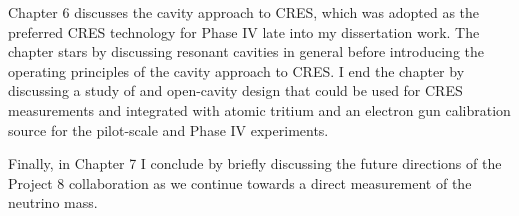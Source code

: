 Chapter 6 discusses the cavity approach to CRES, which was adopted as the preferred CRES technology for Phase IV late into my dissertation work. The chapter stars by discussing resonant cavities in general before introducing the operating principles of the cavity approach to CRES. I end the chapter by discussing a study of and open-cavity design that could be used for CRES measurements and integrated with atomic tritium and an electron gun calibration source for the pilot-scale and Phase IV experiments.

Finally, in Chapter 7 I conclude by briefly discussing the future directions of the Project 8 collaboration as we continue towards a direct measurement of the neutrino mass. 




